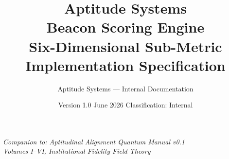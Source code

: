 \documentclass[a4paper,11pt]{article}
\title{{\sffamily\Huge\bfseries\color{navy} Aptitude Systems}\\[0.5em]{\sffamily\Large\color{aptblue} Beacon Scoring Engine}\\[0.3em]{\sffamily\large\color{aptslate} Six-Dimensional Sub-Metric Implementation Specification}}
\author{Aptitude Systems — Internal Documentation}
\date{Version 1.0 \quad June 2026 \quad Classification: Internal}
\begin{document}
\setlength{\tabcolsep}{4pt}
\maketitle
\thispagestyle{empty}
\begin{center}
\textit{Companion to: Aptitudinal Alignment Quantum Manual v0.1}\\
\textit{Volumes I--VI, Institutional Fidelity Field Theory}
\end{center}
\vspace{1em}
\tableofcontents
\newpage


\end{document}
